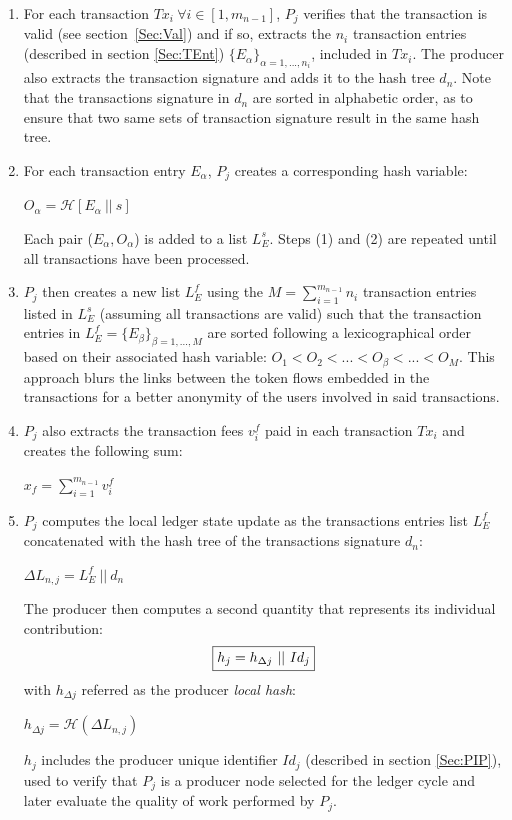 \begin{enumerate}
\item For each transaction $Tx_i~\forall i\in [1,m_{n-1}]$, $P_j$ verifies that the transaction is valid (see section~\ref{Sec:Val}) and if so, extracts the $n_i$ transaction entries (described in section \ref{Sec:TEnt}) $\{E_\alpha\}_{\alpha=1,...,n_i}$, included in $Tx_i$. The producer also extracts the transaction signature and adds it to the hash tree $d_n$. Note that the transactions signature in $d_n$ are sorted in alphabetic order, as to ensure that two same sets of transaction signature result in the same hash tree.

\item For each transaction entry $E_\alpha$, $P_j$ creates a corresponding hash variable: 

\begin{center}
$O_\alpha = \mathcal{H}[E_\alpha~||~s]$
\end{center}

Each pair ($E_\alpha,O_\alpha$) is added to a list $L^s_E$. Steps (1) and (2) are repeated until all transactions have been processed.

\item	$P_j$ then creates a new list $L^f_E$ using the $M=\sum_{i=1}^{m_{n-1}}n_i$ transaction entries listed in $L^s_E$ (assuming all transactions are valid) such that the transaction entries in $L^f_E = \{E_\beta\}_{\beta=1,...,M}$ are sorted following a lexicographical order based on their associated hash variable: $O_1 < O_2 < ... < O_\beta < ... < O_M$. This approach blurs the links between the token flows embedded in the transactions for a better anonymity of the users involved in said transactions.

\item $P_j$ also extracts the transaction fees $v^{f}_i$ paid in each transaction $Tx_i$ and creates the following sum:
\begin{center}
$x_f = \sum_{i=1}^{m_{n-1}} v^{f}_i$
\end{center}

\item $P_j$ computes the local ledger state update as the transactions entries list $L^f_E$ concatenated with the hash tree of the transactions signature $d_n$: 
\begin{center}
$\Delta L_{n,j} = L^f_E~||~d_n $ %
\end{center}

The producer then computes a second quantity that represents its individual contribution:
\begin{equation}
\label{eq:hj}
\fbox{$h_j = h_{\Delta j}~||~Id_j$}
\end{equation}
with $h_{\Delta j}$ referred as the producer \textit{local hash}:
\begin{center}
$h_{\Delta j} = \mathcal{H}(\Delta L_{n,j})$ 
\end{center}
$h_j$ includes the producer unique identifier $Id_j$ (described in section \ref{Sec:PIP}), used to verify that $P_j$ is a producer node selected for the ledger cycle and later evaluate the quality of work performed by $P_j$. 


\end{enumerate}
